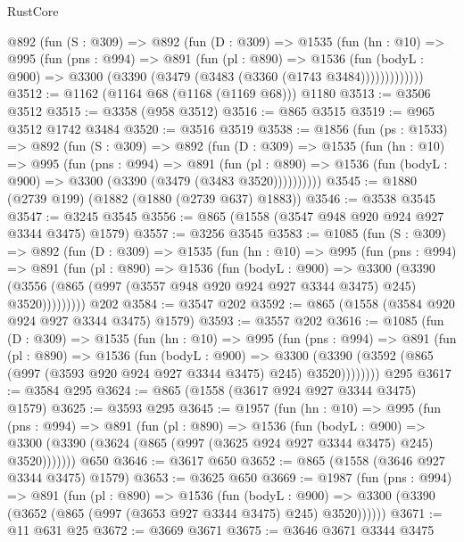 \begin{lexlean}{RustCore}
\begin{coremodule}
      @892
        (fun (S : @309) =>
        @892
          (fun (D : @309) =>
          @1535
            (fun (hn : @10) =>
            @995
              (fun (pns : @994) =>
              @891
                (fun (pl : @890) =>
                @1536
                  (fun (bodyL : @900) => @3300 (@3390 (@3479 (@3483 (@3360 (@1743 @3484)))))))))))))
@3512 := @1162 (@1164 @68 (@1168 (@1169 @68))) @1180
@3513 := @3506 @3512
@3515 := @3358 (@958 @3512)
@3516 := @865 @3515
@3519 := @965 @3512 @1742 @3484
@3520 := @3516 @3519
@3538 := @1856
    (fun (ps : @1533) =>
    @892
      (fun (S : @309) =>
      @892
        (fun (D : @309) =>
        @1535
          (fun (hn : @10) =>
          @995
            (fun (pns : @994) =>
            @891
              (fun (pl : @890) =>
              @1536 (fun (bodyL : @900) => @3300 (@3390 (@3479 (@3483 @3520))))))))))
@3545 := @1880 (@2739 @199) (@1882 (@1880 (@2739 @637) @1883))
@3546 := @3538 @3545
@3547 := @3245 @3545
@3556 := @865 (@1558 (@3547 @948 @920 @924 @927 @3344 @3475) @1579)
@3557 := @3256 @3545
@3583 := @1085
    (fun (S : @309) =>
    @892
      (fun (D : @309) =>
      @1535
        (fun (hn : @10) =>
        @995
          (fun (pns : @994) =>
          @891
            (fun (pl : @890) =>
            @1536
              (fun (bodyL : @900) =>
              @3300
                (@3390
                  (@3556 (@865 (@997 (@3557 @948 @920 @924 @927 @3344 @3475) @245) @3520)))))))))
    @202
@3584 := @3547 @202
@3592 := @865 (@1558 (@3584 @920 @924 @927 @3344 @3475) @1579)
@3593 := @3557 @202
@3616 := @1085
    (fun (D : @309) =>
    @1535
      (fun (hn : @10) =>
      @995
        (fun (pns : @994) =>
        @891
          (fun (pl : @890) =>
          @1536
            (fun (bodyL : @900) =>
            @3300 (@3390 (@3592 (@865 (@997 (@3593 @920 @924 @927 @3344 @3475) @245) @3520))))))))
    @295
@3617 := @3584 @295
@3624 := @865 (@1558 (@3617 @924 @927 @3344 @3475) @1579)
@3625 := @3593 @295
@3645 := @1957
    (fun (hn : @10) =>
    @995
      (fun (pns : @994) =>
      @891
        (fun (pl : @890) =>
        @1536
          (fun (bodyL : @900) =>
          @3300 (@3390 (@3624 (@865 (@997 (@3625 @924 @927 @3344 @3475) @245) @3520)))))))
    @650
@3646 := @3617 @650
@3652 := @865 (@1558 (@3646 @927 @3344 @3475) @1579)
@3653 := @3625 @650
@3669 := @1987
    (fun (pns : @994) =>
    @891
      (fun (pl : @890) =>
      @1536
        (fun (bodyL : @900) =>
        @3300 (@3390 (@3652 (@865 (@997 (@3653 @927 @3344 @3475) @245) @3520))))))
@3671 := @11 @631 @25
@3672 := @3669 @3671
@3675 := @3646 @3671 @3344 @3475

\end{coremodule}
\end{lexlean}
